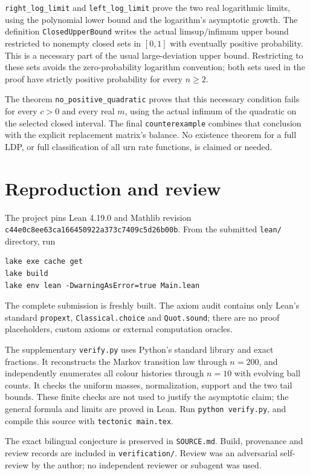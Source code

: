 \documentclass[11pt]{article}
\begin{document}
\newpage
\texttt{right\_log\_limit} and \texttt{left\_log\_limit}
prove the two real logarithmic limits, using the polynomial
lower bound and the logarithm's asymptotic growth. The definition
\texttt{ClosedUpperBound} writes the actual limsup/infimum
upper bound restricted to nonempty closed sets in $[0,1]$
with eventually positive probability. This is a necessary
part of the usual large-deviation upper bound. Restricting to
these sets avoids the zero-probability logarithm convention;
both sets used in the proof have strictly positive probability
for every $n\geq2$.

The theorem \texttt{no\_positive\_quadratic} proves that
this necessary condition fails for every $c>0$ and every real
$m$, using the actual infimum of the quadratic on the selected
closed interval. The final \texttt{counterexample} combines
that conclusion with the explicit replacement matrix's balance.
No existence theorem for a full LDP, or full classification of
all urn rate functions, is claimed or needed.

\section*{Reproduction and review}
The project pins Lean 4.19.0 and Mathlib revision\\
\texttt{c44e0c8ee63ca166450922a373c7409c5d26b00b}.
From the submitted \texttt{lean/} directory, run
\begin{verbatim}
lake exe cache get
lake build
lake env lean -DwarningAsError=true Main.lean
\end{verbatim}
The complete submission is freshly built. The axiom audit
contains only Lean's standard \texttt{propext},
\texttt{Classical.choice} and \texttt{Quot.sound}; there are no
proof placeholders, custom axioms or external computation
oracles.

The supplementary \texttt{verify.py} uses Python's standard
library and exact fractions. It reconstructs the Markov
transition law through $n=200$, and independently enumerates
all colour histories through $n=10$ with evolving ball counts.
It checks the uniform masses, normalization, support and the
two tail bounds. These finite checks are not used to justify
the asymptotic claim; the general formula and limits are
proved in Lean. Run \texttt{python verify.py}, and compile
this source with \texttt{tectonic main.tex}.

The exact bilingual conjecture is preserved in \texttt{SOURCE.md}.
Build, provenance and review records are included in
\texttt{verification/}. Review was an adversarial self-review
by the author; no independent reviewer or subagent was used.
\end{document}
